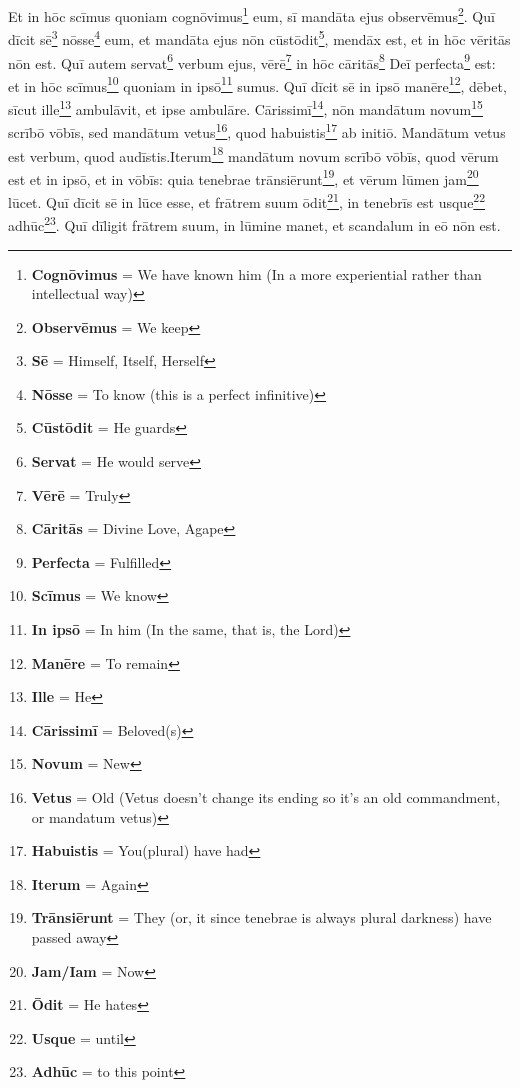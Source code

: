  Et in hōc scīmus quoniam cognōvimus\footnote{\textbf{Cognōvimus} = We have known him (In a more experiential rather than intellectual way)} eum, sī mandāta ejus observēmus\footnote{\textbf{Observēmus} = We keep}. Quī dīcit sē\footnote{\textbf{Sē} = Himself, Itself, Herself} nōsse\footnote{\textbf{Nōsse} = To know (this is a perfect infinitive)} eum, et mandāta ejus nōn cūstōdit\footnote{\textbf{Cūstōdit} = He guards}, mendāx est, et in hōc vēritās nōn est. Quī autem servat\footnote{\textbf{Servat} = He would serve} verbum ejus, vērē\footnote{\textbf{Vērē} = Truly} in hōc cāritās\footnote{\textbf{Cāritās} = Divine Love, Agape} Deī perfecta\footnote{\textbf{Perfecta} = Fulfilled} est: et in hōc scīmus\footnote{\textbf{Scīmus} = We know} quoniam in ipsō\footnote{\textbf{In ipsō} = In him (In the same, that is, the Lord)} sumus. Quī dīcit sē in ipsō manēre\footnote{\textbf{Manēre} = To remain}, dēbet, sīcut ille\footnote{\textbf{Ille} = He} ambulāvit, et ipse ambulāre. Cārissimī\footnote{\textbf{Cārissimī} = Beloved(s)}, nōn mandātum novum\footnote{\textbf{Novum} = New} scrībō vōbīs, sed mandātum vetus\footnote{\textbf{Vetus} = Old (Vetus doesn't change its ending so it's an old commandment, or mandatum vetus)}, quod habuistis\footnote{\textbf{Habuistis} = You(plural) have had} ab initiō. Mandātum vetus est verbum, quod audīstis.Iterum\footnote{\textbf{Iterum} = Again} mandātum novum scrībō vōbīs, quod vērum est et in ipsō, et in vōbīs: quia tenebrae trānsiērunt\footnote{\textbf{Trānsiērunt} = They (or, it since tenebrae is always plural darkness) have passed away}, et vērum lūmen jam\footnote{\textbf{Jam/Iam} = Now} lūcet. Quī dīcit sē in lūce esse, et frātrem suum ōdit\footnote{\textbf{Ōdit} = He hates}, in tenebrīs est usque\footnote{\textbf{Usque} = until} adhūc\footnote{\textbf{Adhūc} = to this point}. Quī dīligit frātrem suum, in lūmine manet, et scandalum in eō nōn est.
